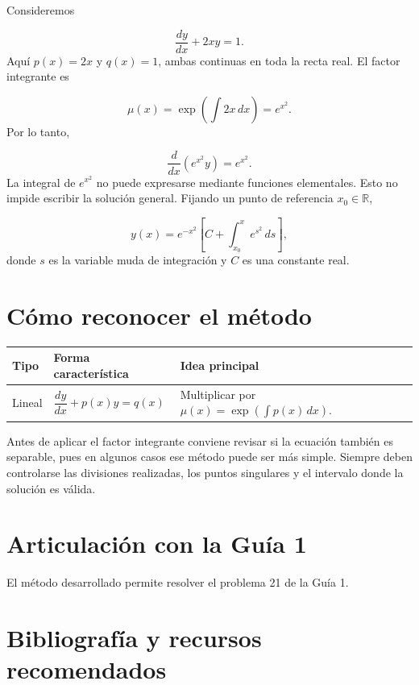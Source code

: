 \documentclass[12pt,a4paper]{article}
\begin{document}
	Consideremos

	\[
	\frac{dy}{dx}+2xy=1.
	\]
	Aquí \(p(x)=2x\) y \(q(x)=1\), ambas continuas en toda la recta real. El factor integrante es

	\[
	\mu(x)=\exp\left(\int 2x\,dx\right)=e^{x^2}.
	\]
	Por lo tanto,

	\[
	\frac{d}{dx}\left(e^{x^2}y\right)=e^{x^2}.
	\]
	La integral de \(e^{x^2}\) no puede expresarse mediante funciones elementales. Esto no impide escribir la solución general. Fijando un punto de referencia \(x_0\in\mathbb{R}\),

	\[
	\boxed{
	y(x)
	=
	e^{-x^2}
	\left[
	C+\int_{x_0}^{x}e^{s^2}\,ds
	\right],
	}
	\]
	donde \(s\) es la variable muda de integración y \(C\) es una constante real.

	\section{Cómo reconocer el método}

	\begin{center}
	\begin{tabularx}{\textwidth}{@{}
		>{\raggedright\arraybackslash}p{}
		>{\raggedright\arraybackslash}X
		>{\raggedright\arraybackslash}X@{}}
		\toprule
		\textbf{Tipo} & \textbf{Forma característica} & \textbf{Idea principal} \\
		\midrule
		Lineal &
		\(\dfrac{dy}{dx}+p(x)y=q(x)\) &
		Multiplicar por \(\mu(x)=\exp(\int p(x)\,dx)\). \\
		\bottomrule
	\end{tabularx}
	\end{center}

	Antes de aplicar el factor integrante conviene revisar si la ecuación también es separable, pues en algunos casos ese método puede ser más simple. Siempre deben controlarse las divisiones realizadas, los puntos singulares y el intervalo donde la solución es válida.

	\section*{Articulación con la Guía 1}

	El método desarrollado permite resolver el problema 21 de la Guía 1.

	\section*{Bibliografía y recursos recomendados}
\end{document}

